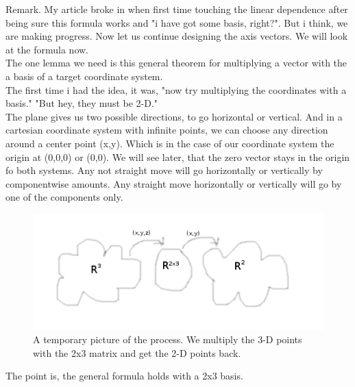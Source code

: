 \documentclass[a4paper]{article}
\begin{document}
Remark. My article broke in when first time touching the linear dependence after being sure this formula works and "i have got some basis, right?". But i think, we are making progress. Now let us continue designing the axis vectors. We will look at the formula now.\\

The one lemma we need is this general theorem for multiplying a vector with the a basis of a target coordinate system.\\

The first time i had the idea, it was, "now try multiplying the coordinates with a basis." "But hey, they must be 2-D."\\

The plane gives us two possible directions, to go horizontal or vertical. And in a cartesian coordinate system with infinite points, we can choose any direction around a center point (x,y). Which is in the case of our coordinate system the origin at (0,0,0) or (0,0). We will see later, that the zero vector stays in the origin fo both systems.
Any not straight move will go horizontally or vertically by componentwise amounts. Any straight move horizontally or vertically will go by one of the components only.\\

\begin{figure}
\includegraphics{mediator.png}
\caption{A temporary picture of the process. We multiply the 3-D points with the 2x3 matrix and get the 2-D points back.}
\end{figure}

The point is, the general formula holds with a 2x3 basis.\\
\end{document}
